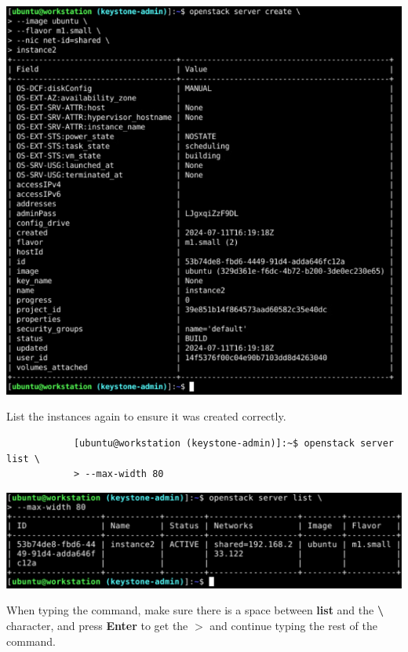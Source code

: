 \documentclass[letterpaper, 12pt]{article}
\begin{document}
\begin{enumerate}
\begin{labstep}
        \begin{center}
            \includegraphics[width=\linewidth]{images/part2/step3.png}
        \end{center}
    \end{labstep}

    \begin{labstep}
        List the instances again to ensure it was created correctly.
        \begin{lstlisting}
            [ubuntu@workstation (keystone-admin)]:~$ openstack server list \
            > --max-width 80
        \end{lstlisting}

        \begin{center}
            \includegraphics[width=\linewidth]{images/part2/step4.png}
        \end{center}
    \end{labstep}

    \begin{tipbox}
        When typing the command, make sure there is a space between \textbf{list} and the \textbf{\textbackslash} character, and press \textbf{Enter} to get the \textbf{$>$} and continue typing the rest of the command.
    \end{tipbox}


\end{enumerate}
\end{document}
